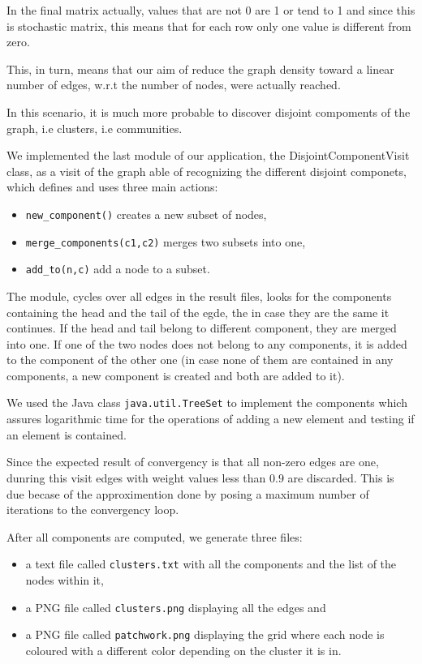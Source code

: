 In the  final matrix actually, values that are not 0 are 1 or tend to 1
and since this is stochastic matrix, this means that for each row
only one value is different from zero.

This, in turn, means that our aim of reduce the graph density toward
a linear number of edges, w.r.t the number of nodes, were  actually reached.

In this scenario, it is much more probable to discover disjoint compoments
of the graph, i.e clusters, i.e communities.

We implemented the last module of our application, the DisjointComponentVisit
class, as a visit
of the graph able of recognizing the different disjoint componets, which
defines and uses three main actions:
\begin{itemize}
    \item \verb!new_component()! creates a new subset of nodes,
    \item \verb!merge_components(c1,c2)! merges two subsets into one,
    \item \verb!add_to(n,c)! add a node to a subset.
\end{itemize}

The module, cycles over all edges in the result files, looks
for the components containing the head and the tail of the egde,
the in case they are the same it continues. If the head and tail
belong to different component, they are merged into one.
If one of the two nodes does not belong to any components, it is
added  to the component of the other one (in case none of them 
are contained in any components, a new component is created and both
are added to it).

We used the Java class \verb!java.util.TreeSet! to implement
the components which assures logarithmic time for
the operations of adding a new element and testing if an element
is contained. 

Since the expected result of convergency is that all non-zero edges
are one, dunring this visit edges with weight values less than $0.9$
are discarded. This is due becase of the approximention done by
posing a maximum number of iterations to the convergency loop.

After all components are computed, we generate three files:
\begin{itemize}
\item a text file called \verb!clusters.txt! with all the components and
the list of the nodes within it,
\item a PNG file called \verb!clusters.png! displaying all the edges and
\item a PNG file called \verb!patchwork.png! displaying the grid where
each node is coloured with a different color depending on the cluster it
is in.
\end{itemize}


